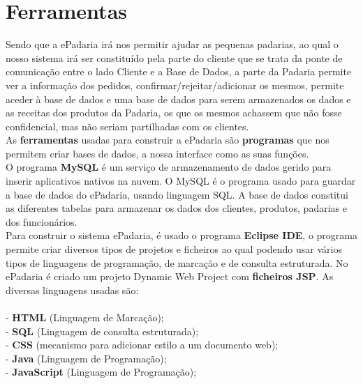 \section{Ferramentas}
Sendo que a ePadaria irá nos permitir ajudar as pequenas padarias, ao qual o nosso sistema irá ser constituído pela parte do cliente que se trata da ponte de comunicação entre o lado Cliente e a Base de Dados, a parte da Padaria permite ver a informação dos pedidos, confirmar/rejeitar/adicionar os mesmos, permite aceder à base de dados e uma base de dados para serem armazenados os dados e as receitas dos produtos da Padaria, os que os mesmos achassem que não fosse confidencial, mas não seriam partilhadas com os clientes.\\
As \textbf{ferramentas} usadas para construir a ePadaria são \textbf{programas} que nos permitem criar bases de dados, a nossa interface como as suas funções. \\
O programa \textbf{MySQL} é um serviço de armazenamento de dados gerido para inserir aplicativos nativos na nuvem. O MySQL é o programa usado para guardar a base de dados do ePadaria, usando linguagem SQL. A base de dados constitui as diferentes tabelas para armazenar os dados dos clientes, produtos, padarias e dos funcionários.\\
Para construir o sistema ePadaria, é usado o programa \textbf{Eclipse IDE}, o programa permite criar diversos tipos de projetos e ficheiros ao qual podendo usar vários tipos de linguagens de programação, de marcação e de consulta estruturada. No ePadaria é criado um projeto Dynamic Web Project com \textbf{ficheiros JSP}. As diversas linguagens usadas são:\\
\\
- \textbf{HTML}  (Linguagem de Marcação);\\
- \textbf{SQL}  (Linguagem de consulta estruturada);\\
- \textbf{CSS}  (mecanismo para adicionar estilo a um documento web);\\
- \textbf{Java}  (Linguagem de Programação);\\
- \textbf{JavaScript} (Linguagem de Programação);\\
